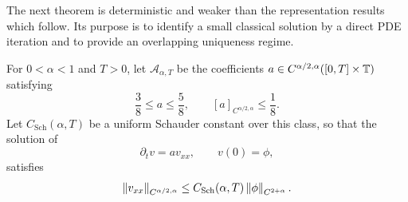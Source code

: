 The next theorem is deterministic and weaker than the representation results which follow. Its purpose is to identify a small classical solution by a direct PDE iteration and to provide an overlapping uniqueness regime.

For $0<\alpha<1$ and $T>0$, let $\mathcal A_{\alpha,T}$ be the coefficients $a\in C^{\alpha/2,\alpha}([0,T]\times\mathbb T)$ satisfying
\begin{equation*}
  \frac38\leq a\leq\frac58,
  \qquad
  [a]_{C^{\alpha/2,\alpha}}\leq\frac18.
\end{equation*}
Let $C_{\mathrm{Sch}}(\alpha,T)$ be a uniform Schauder constant over this class, so that the solution of
\begin{equation*}
  \partial_tv=av_{xx},
  \qquad v(0)=\phi,
\end{equation*}
satisfies
\begin{equation*}
  \left\lVert v_{xx}\right\rVert_{C^{\alpha/2,\alpha}}
  \leq
  C_{\mathrm{Sch}}(\alpha,T)\left\lVert\phi\right\rVert_{C^{2+\alpha}}.
\end{equation*}

